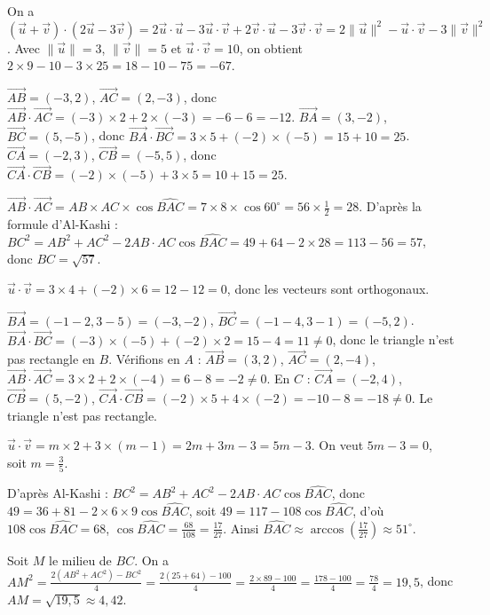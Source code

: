 On a $(\vec{u}+\vec{v})\cdot(2\vec{u}-3\vec{v}) = 2\vec{u}\cdot\vec{u} -3\vec{u}\cdot\vec{v} +2\vec{v}\cdot\vec{u} -3\vec{v}\cdot\vec{v} = 2\|\vec{u}\|^2 - \vec{u}\cdot\vec{v} -3\|\vec{v}\|^2$.
Avec $\|\vec{u}\|=3$, $\|\vec{v}\|=5$ et $\vec{u}\cdot\vec{v}=10$, on obtient $2\times9 -10 -3\times25 = 18-10-75 = -67$.

$\overrightarrow{AB}=(-3,2)$, $\overrightarrow{AC}=(2,-3)$, donc $\overrightarrow{AB}\cdot\overrightarrow{AC}=(-3)\times2+2\times(-3)=-6-6=-12$.
$\overrightarrow{BA}=(3,-2)$, $\overrightarrow{BC}=(5,-5)$, donc $\overrightarrow{BA}\cdot\overrightarrow{BC}=3\times5+(-2)\times(-5)=15+10=25$.
$\overrightarrow{CA}=(-2,3)$, $\overrightarrow{CB}=(-5,5)$, donc $\overrightarrow{CA}\cdot\overrightarrow{CB}=(-2)\times(-5)+3\times5=10+15=25$.

$\overrightarrow{AB}\cdot\overrightarrow{AC}=AB\times AC\times\cos\widehat{BAC}=7\times8\times\cos60^\circ=56\times\frac12=28$.
D'après la formule d'Al-Kashi : $BC^2=AB^2+AC^2-2AB\cdot AC\cos\widehat{BAC}=49+64-2\times28=113-56=57$, donc $BC=\sqrt{57}$.

$\vec{u}\cdot\vec{v}=3\times4+(-2)\times6=12-12=0$, donc les vecteurs sont orthogonaux.

$\overrightarrow{BA}=(-1-2,3-5)=(-3,-2)$, $\overrightarrow{BC}=(-1-4,3-1)=(-5,2)$.
$\overrightarrow{BA}\cdot\overrightarrow{BC}=(-3)\times(-5)+(-2)\times2=15-4=11\neq0$, donc le triangle n'est pas rectangle en $B$.
Vérifions en $A$ : $\overrightarrow{AB}=(3,2)$, $\overrightarrow{AC}=(2,-4)$, $\overrightarrow{AB}\cdot\overrightarrow{AC}=3\times2+2\times(-4)=6-8=-2\neq0$.
En $C$ : $\overrightarrow{CA}=(-2,4)$, $\overrightarrow{CB}=(5,-2)$, $\overrightarrow{CA}\cdot\overrightarrow{CB}=(-2)\times5+4\times(-2)=-10-8=-18\neq0$. Le triangle n'est pas rectangle.

$\vec{u}\cdot\vec{v}=m\times2+3\times(m-1)=2m+3m-3=5m-3$. On veut $5m-3=0$, soit $m=\frac35$.

D'après Al-Kashi : $BC^2=AB^2+AC^2-2AB\cdot AC\cos\widehat{BAC}$, donc $49=36+81-2\times6\times9\cos\widehat{BAC}$, soit $49=117-108\cos\widehat{BAC}$, d'où $108\cos\widehat{BAC}=68$, $\cos\widehat{BAC}=\frac{68}{108}=\frac{17}{27}$. Ainsi $\widehat{BAC}\approx\arccos\left(\frac{17}{27}\right)\approx51^\circ$.

Soit $M$ le milieu de $BC$. On a $AM^2=\frac{2(AB^2+AC^2)-BC^2}{4}=\frac{2(25+64)-100}{4}=\frac{2\times89-100}{4}=\frac{178-100}{4}=\frac{78}{4}=19,5$, donc $AM=\sqrt{19,5}\approx4,42$.


